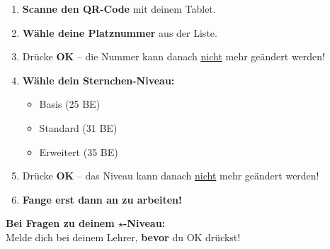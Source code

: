 \documentclass[11pt, a4paper]{article}
\begin{document}
\begin{tcolorbox}[
    colback=physik-hell,
    colframe=physik,
    boxrule=1.5pt,
    arc=0pt,
    title={\large\bfseries So startest du:},
    coltitle=white,
    fonttitle=\sffamily
]

\begin{enumerate}[leftmargin=2em, itemsep=8pt, label={\textcolor{physik}{\Large\textbf{\arabic*.}}}]
    \item \textbf{Scanne den QR-Code} mit deinem Tablet.

    \item \textbf{Wähle deine Platznummer} aus der Liste.

    \item Drücke \textbf{OK} -- die Nummer kann danach \underline{nicht} mehr geändert werden!

    \item \textbf{Wähle dein Sternchen-Niveau:}
    \begin{itemize}[leftmargin=1.5em, itemsep=2pt]
        \item[$\star$] Basis (25 BE)
        \item[$\star\star$] Standard (31 BE)
        \item[$\star\star\star$] Erweitert (35 BE)
    \end{itemize}

    \item Drücke \textbf{OK} -- das Niveau kann danach \underline{nicht} mehr geändert werden!

    \item \textbf{Fange erst dann an zu arbeiten!}
\end{enumerate}

\end{tcolorbox}

\vspace{1em}


\begin{tcolorbox}[
    colback=warnung-hell,
    colframe=warnung,
    boxrule=1.5pt,
    arc=0pt
]
\textbf{\textcolor{warnung}{Bei Fragen zu deinem $\star$-Niveau:}}\\[0.3em]
Melde dich bei deinem Lehrer, \textbf{bevor} du OK drückst!
\end{tcolorbox}

\vspace{1em}
\end{document}
